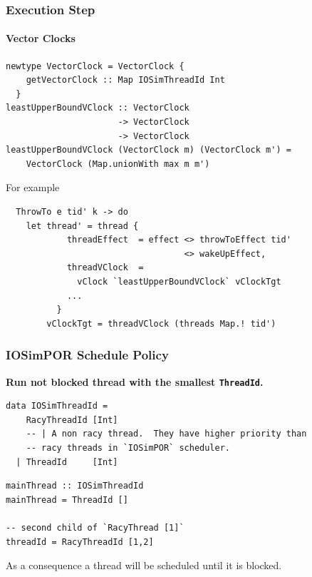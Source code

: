 \documentclass[t,x11names,xcolor={x11names},hyperref={colorlinks,citecolor=Blue4,linkcolor=Blue4,anchorcolor=Blue4,urlcolor=Blue4}]{beamer}
\begin{document}
\begin{frame}[fragile]
  \frametitle{Execution Step}
  \framesubtitle{Vector Clocks}
  {\small
  \begin{verbatim}
newtype VectorClock = VectorClock {
    getVectorClock :: Map IOSimThreadId Int
  }
leastUpperBoundVClock :: VectorClock
                      -> VectorClock
                      -> VectorClock
leastUpperBoundVClock (VectorClock m) (VectorClock m') =
    VectorClock (Map.unionWith max m m')
  \end{verbatim}
  }

  For example

  {\small
  \begin{verbatim}
  ThrowTo e tid' k -> do
    let thread' = thread {
            threadEffect  = effect <> throwToEffect tid'
                                   <> wakeUpEffect,
            threadVClock  =
              vClock `leastUpperBoundVClock` vClockTgt
            ...
          }
        vClockTgt = threadVClock (threads Map.! tid')
  \end{verbatim}
  }

\end{frame}

\begin{frame}[fragile]
  \frametitle{IOSimPOR Schedule Policy}
  {\bf Run not blocked thread with the smallest \texttt{ThreadId}.}
  {\small
  \begin{verbatim}
data IOSimThreadId =
    RacyThreadId [Int]
    -- | A non racy thread.  They have higher priority than
    -- racy threads in `IOSimPOR` scheduler.
  | ThreadId     [Int]
  \end{verbatim}

  \begin{verbatim}
mainThread :: IOSimThreadId
mainThread = ThreadId []

-- second child of `RacyThread [1]`
threadId = RacyThreadId [1,2]
  \end{verbatim}
  }

As a consequence a thread will be scheduled until it is blocked.
\end{frame}
\end{document}
